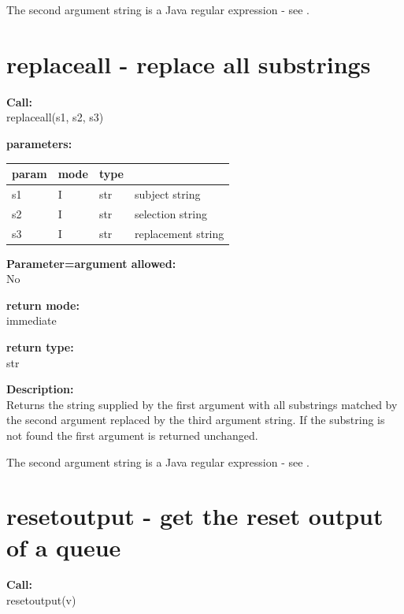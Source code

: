         The second argument string is a Java regular expression - 
        see .


    \section{replaceall - replace all substrings}\label{sec:ifreplaceall}
        
        {\bf Call:} \\
        replaceall(s1, s2, s3)
        
        {\bf parameters:} \\
        \begin{tabular}{| l | l | l | l |}
        \hline
        param  & mode & type & \\
        \hline \hline
        s1 & I & str & subject string       \\ \hline
        s2 & I & str & selection string     \\ \hline
        s3 & I & str & replacement string   \\ \hline
        \end{tabular}
        
        {\bf Parameter=argument allowed:} \\
        No
        
        {\bf return mode:} \\
        immediate

        {\bf return type:} \\
        str
        
        {\bf Description:} \\
        Returns the string supplied by the first argument with all
        substrings matched by the second argument replaced by the third argument
        string. If the substring is not found the first argument is returned
        unchanged.
        
        The second argument string is a Java regular expression - 
        see .
      
 

    \section{resetoutput - get the reset output of a queue}\label{sec:ifresetoutput}
        
        {\bf Call:} \\
        resetoutput(v)
        
